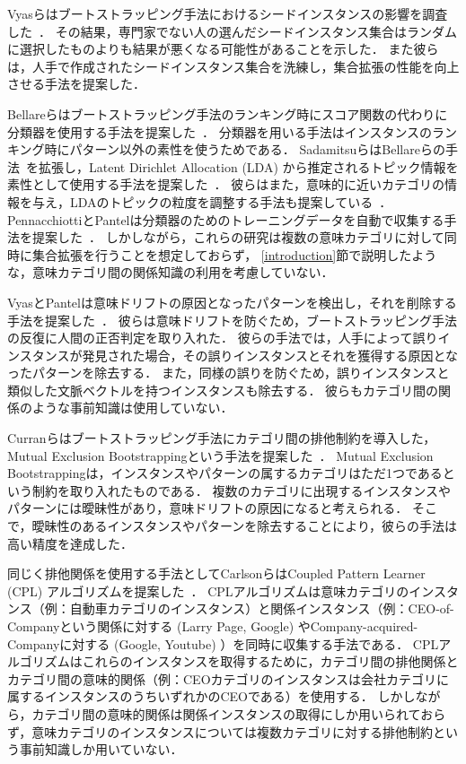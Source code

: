 \documentclass[japanese]{jnlp_1.4}
\begin{document}
Vyasらはブートストラッピング手法におけるシードインスタンスの影響を調査した~\cite{Vyas:2009:HEC:1645953.1645984}．
その結果，専門家でない人の選んだシードインスタンス集合はランダムに選択したものよりも結果が悪くなる可能性があることを示した．
また彼らは，人手で作成されたシードインスタンス集合を洗練し，集合拡張の性能を向上させる手法を提案した．

Bellareらはブートストラッピング手法のランキング時にスコア関数の代わりに分類器を使用する手法を提案した~\cite{Bellare_lightlysupervisedattribute}．
分類器を用いる手法はインスタンスのランキング時にパターン以外の素性を使うためである．
SadamitsuらはBellareらの手法~\cite{Bellare_lightlysupervisedattribute}を拡張し，Latent Dirichlet Allocation (LDA) から推定されるトピック情報を素性として使用する手法を提案した~\cite{Sadamitsu:2011:ESE:2002736.2002876}．
彼らはまた，意味的に近いカテゴリの情報を与え，LDAのトピックの粒度を調整する手法も提案している~\cite{Sadamitsu:2012:PACLIC26}．
PennacchiottiとPantelは分類器のためのトレーニングデータを自動で収集する手法を提案した~\cite{Pennacchiotti:2011:ABT:2018936.2018955}．
しかしながら，これらの研究は複数の意味カテゴリに対して同時に集合拡張を行うことを想定しておらず，
\ref{introduction}節で説明したような，意味カテゴリ間の関係知識の利用を考慮していない．

VyasとPantelは意味ドリフトの原因となったパターンを検出し，それを削除する手法を提案した~\cite{Vyas:2009:SES:1620754.1620796}．
彼らは意味ドリフトを防ぐため，ブートストラッピング手法の反復に人間の正否判定を取り入れた．
彼らの手法では，人手によって誤りインスタンスが発見された場合，その誤りインスタンスとそれを獲得する原因となったパターンを除去する．
また，同様の誤りを防ぐため，誤りインスタンスと類似した文脈ベクトルを持つインスタンスも除去する．
彼らもカテゴリ間の関係のような事前知識は使用していない．

Curranらはブートストラッピング手法にカテゴリ間の排他制約を導入した，Mutual Exclusion Bootstrappingという手法を提案した~\cite{Curran_minimisingsemantic}．
Mutual Exclusion Bootstrappingは，インスタンスやパターンの属するカテゴリはただ1つであるという制約を取り入れたものである．
複数のカテゴリに出現するインスタンスやパターンには曖昧性があり，意味ドリフトの原因になると考えられる．
そこで，曖昧性のあるインスタンスやパターンを除去することにより，彼らの手法は高い精度を達成した．

同じく排他関係を使用する手法としてCarlsonらはCoupled Pattern Learner (CPL) アルゴリズムを提案した~\cite{carlson-wsdm}．
CPLアルゴリズムは意味カテゴリのインスタンス（例：自動車カテゴリのインスタンス）と関係インスタンス（例：CEO-of-Companyという関係に対する (Larry Page, Google) やCompany-acquired-Companyに対する (Google, Youtube) ）を同時に収集する手法である．
CPLアルゴリズムはこれらのインスタンスを取得するために，カテゴリ間の排他関係とカテゴリ間の意味的関係（例：CEOカテゴリのインスタンスは会社カテゴリに属するインスタンスのうちいずれかのCEOである）を使用する．
しかしながら，カテゴリ間の意味的関係は関係インスタンスの取得にしか用いられておらず，意味カテゴリのインスタンスについては複数カテゴリに対する排他制約という事前知識しか用いていない．
\end{document}
